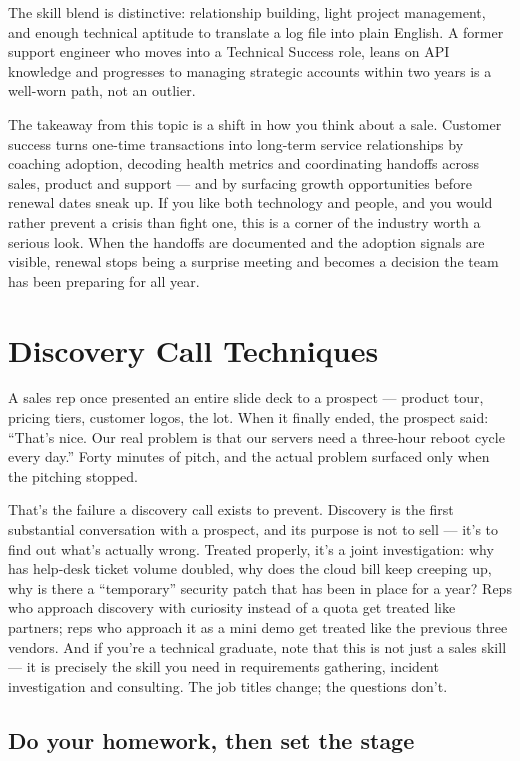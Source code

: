 The skill blend is distinctive: relationship building, light project management, and enough technical aptitude to translate a log file into plain English. A former support engineer who moves into a Technical Success role, leans on API knowledge and progresses to managing strategic accounts within two years is a well-worn path, not an outlier.


The takeaway from this topic is a shift in how you think about a sale. Customer success turns one-time transactions into long-term service relationships by coaching adoption, decoding health metrics and coordinating handoffs across sales, product and support — and by surfacing growth opportunities before renewal dates sneak up. If you like both technology and people, and you would rather prevent a crisis than fight one, this is a corner of the industry worth a serious look. When the handoffs are documented and the adoption signals are visible, renewal stops being a surprise meeting and becomes a decision the team has been preparing for all year.

\section{Discovery Call Techniques}
A sales rep once presented an entire slide deck to a prospect — product tour, pricing tiers, customer logos, the lot. When it finally ended, the prospect said: ``That's nice. Our real problem is that our servers need a three-hour reboot cycle every day.'' Forty minutes of pitch, and the actual problem surfaced only when the pitching stopped.


That's the failure a discovery call exists to prevent. Discovery is the first substantial conversation with a prospect, and its purpose is not to sell — it's to find out what's actually wrong. Treated properly, it's a joint investigation: why has help-desk ticket volume doubled, why does the cloud bill keep creeping up, why is there a ``temporary'' security patch that has been in place for a year? Reps who approach discovery with curiosity instead of a quota get treated like partners; reps who approach it as a mini demo get treated like the previous three vendors. And if you're a technical graduate, note that this is not just a sales skill — it is precisely the skill you need in requirements gathering, incident investigation and consulting. The job titles change; the questions don't.



\subsection{Do your homework, then set the stage}


